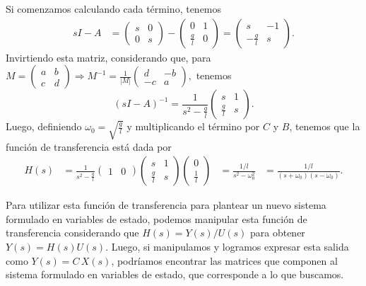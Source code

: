 \documentclass[
  11pt,
  letterpaper,
   addpoints,
  answers
  ]{exam}
\begin{document}
\begin{questions}
\begin{solution}
Si comenzamos calculando cada término, tenemos
\begin{align}
sI-A&=
\begin{pmatrix}s&0\\[2pt]0&s\end{pmatrix}-
\begin{pmatrix}0&1\\[2pt]\frac{g}{l}&0\end{pmatrix}
=
\begin{pmatrix}
s&-1\\[2pt]
-\frac{g}{l}&s
\end{pmatrix}.
\end{align}
Invirtiendo esta matriz, considerando que, para
\(
M=\begin{pmatrix}a&b\\ c&d\end{pmatrix}
\Rightarrow
M^{-1}=\frac{1}{|M|}
\begin{pmatrix}d&-b\\ -c&a\end{pmatrix},
\)
tenemos
\begin{equation}
(sI-A)^{-1}=\frac{1}{s^{2}-\frac{g}{l}}
\begin{pmatrix}
s&1\\[2pt]
\frac{g}{l}&s
\end{pmatrix}.
\end{equation}
Luego, definiendo $\omega_0=\sqrt{\frac{g}{l}}$ y multiplicando el término por $C$ y $B$, tenemos que la función de transferencia está dada por
\begin{align}
H(s)
&=\frac{1}{s^{2}-\frac{g}{l}}
\begin{pmatrix}1&0\end{pmatrix}
\begin{pmatrix}
s&1\\[2pt]\frac{g}{l}&s
\end{pmatrix}
\begin{pmatrix}0\\[2pt]\frac{1}{l}\end{pmatrix}
&=\frac{1/l}{s^{2}-\omega_{0}^{2}}
&=\frac{1/l}{(s+\omega_0)(s-\omega_0)}.
\end{align}

Para utilizar esta función de transferencia para plantear un nuevo sistema formulado en variables de estado, podemos manipular esta función de transferencia considerando que $H(s)=Y(s)/U(s)$ para obtener $Y(s)=H(s)U(s)$. Luego, si manipulamos y logramos expresar esta salida como $Y(s)=C\,X(s)$, podríamos encontrar las matrices que componen al sistema formulado en variables de estado, que corresponde a lo que buscamos.


\end{solution}
\end{questions}
\end{document}
